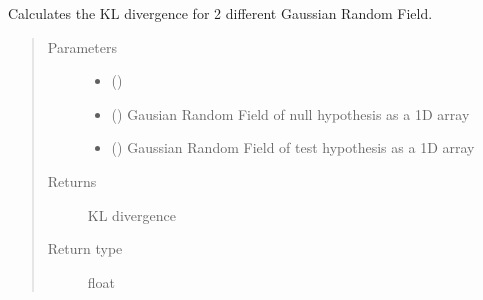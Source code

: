 \documentclass[letterpaper,10pt,english]{sphinxmanual}
\begin{document}
\begin{fulllineitems}
\label{\detokenize{utilities:utilities.KLdivergence}}
\sphinxAtStartPar
Calculates the KL divergence for 2 different Gaussian Random Field.
\begin{quote}\begin{description}
\item[{Parameters}] \leavevmode\begin{itemize}
\item {} 
\sphinxAtStartPar
{} () \textendash{} 

\item {} 
\sphinxAtStartPar
{} () \textendash{} Gausian Random Field of null hypothesis as a 1\sphinxhyphen{}D array

\item {} 
\sphinxAtStartPar
{} () \textendash{} Gaussian Random Field of test hypothesis as a 1\sphinxhyphen{}D array

\end{itemize}

\item[{Returns}] \leavevmode
\sphinxAtStartPar
KL divergence

\item[{Return type}] \leavevmode
\sphinxAtStartPar
float

\end{description}\end{quote}

\end{fulllineitems}

\end{document}
